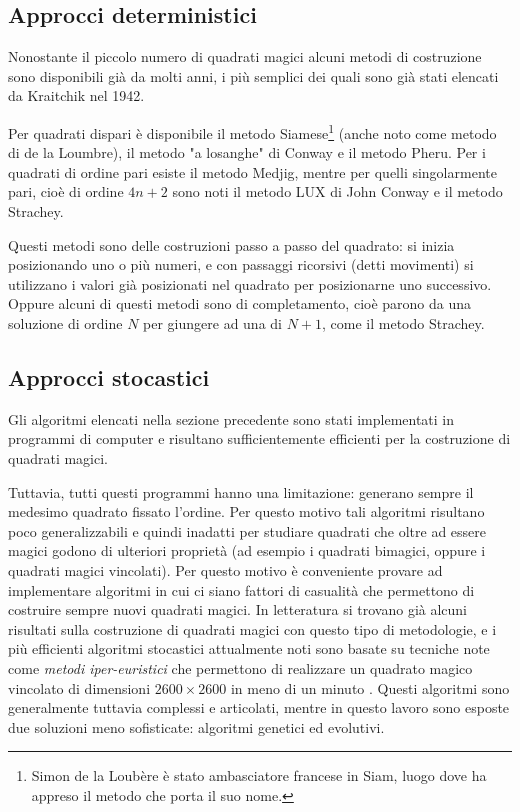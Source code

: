 \documentclass[italian,twoside,twocolumn]{article}
\begin{document}
\subsection{Approcci deterministici}
Nonostante il piccolo numero di quadrati magici alcuni metodi di costruzione sono disponibili già da molti anni, i più semplici dei quali sono già stati elencati da Kraitchik \cite{Krai:1942} nel 1942.

Per quadrati dispari è disponibile il metodo Siamese\footnote{Simon de la Loubère è stato ambasciatore francese in Siam, luogo dove ha appreso il metodo che porta il suo nome.} (anche noto come metodo di de la Loumbre), il metodo "a losanghe" di Conway e il metodo Pheru.
Per i quadrati di ordine pari esiste il metodo Medjig, mentre per quelli singolarmente pari, cioè di ordine $ 4n + 2 $ sono noti il metodo LUX di John Conway e il metodo Strachey.

Questi metodi sono delle costruzioni passo a passo del quadrato: si inizia posizionando uno o più numeri, e con passaggi ricorsivi (detti movimenti) si utilizzano i valori già posizionati nel quadrato per posizionarne uno successivo. Oppure alcuni di questi metodi sono di completamento, cioè parono da una soluzione di ordine $ N $ per giungere ad una di $ N + 1 $, come il metodo Strachey.

\subsection{Approcci stocastici}
Gli algoritmi elencati nella sezione precedente sono stati implementati in programmi di computer e risultano sufficientemente efficienti per la costruzione di quadrati magici. 

Tuttavia, tutti questi programmi hanno una limitazione: generano sempre il medesimo quadrato fissato l'ordine. Per questo motivo tali algoritmi risultano poco generalizzabili e quindi inadatti per studiare quadrati che oltre ad essere magici godono di ulteriori proprietà (ad esempio i quadrati bimagici, oppure i quadrati magici vincolati). Per questo motivo è conveniente provare ad implementare algoritmi in cui ci siano fattori di casualità che permettono di costruire sempre nuovi quadrati magici. In letteratura si trovano già alcuni risultati sulla costruzione di quadrati magici con questo tipo di metodologie, e i più efficienti algoritmi stocastici attualmente noti sono basate su tecniche note come \emph{metodi iper-euristici} che permettono di realizzare un quadrato magico vincolato di dimensioni $ 2600\times 2600 $ in meno di un minuto \cite{AhmedEnder:2014}. Questi algoritmi sono generalmente tuttavia complessi e articolati, mentre in questo lavoro sono esposte due soluzioni meno sofisticate: algoritmi genetici ed evolutivi. 
\end{document}
